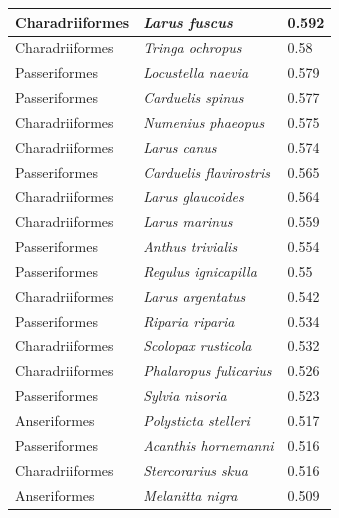 \documentclass{article}
\begin{document}
\begin{longtable}{|p{} | p{} | p{} |}
  Charadriiformes & \textit{Larus fuscus}                  & 0.592                \\ \hline
  Charadriiformes & \textit{Tringa ochropus}               & 0.58                 \\ \hline
  Passeriformes   & \textit{Locustella naevia}             & 0.579                \\ \hline
  Passeriformes   & \textit{Carduelis spinus}              & 0.577                \\ \hline
  Charadriiformes & \textit{Numenius phaeopus}             & 0.575                \\ \hline
  Charadriiformes & \textit{Larus canus}                   & 0.574                \\ \hline
  Passeriformes   & \textit{Carduelis flavirostris}        & 0.565                \\ \hline
  Charadriiformes & \textit{Larus glaucoides}              & 0.564                \\ \hline
  Charadriiformes & \textit{Larus marinus}                 & 0.559                \\ \hline
  Passeriformes   & \textit{Anthus trivialis}              & 0.554                \\ \hline
  Passeriformes   & \textit{Regulus ignicapilla}           & 0.55                 \\ \hline
  Charadriiformes & \textit{Larus argentatus}              & 0.542                \\ \hline
  Passeriformes   & \textit{Riparia riparia}               & 0.534                \\ \hline
  Charadriiformes & \textit{Scolopax rusticola}            & 0.532                \\ \hline
  Charadriiformes & \textit{Phalaropus fulicarius}         & 0.526                \\ \hline
  Passeriformes   & \textit{Sylvia nisoria}                & 0.523                \\ \hline
  Anseriformes    & \textit{Polysticta stelleri}           & 0.517                \\ \hline
  Passeriformes   & \textit{Acanthis hornemanni}           & 0.516                \\ \hline
  Charadriiformes & \textit{Stercorarius skua}             & 0.516                \\ \hline
  Anseriformes    & \textit{Melanitta nigra}               & 0.509                \\ \hline

\end{longtable}
\end{document}
